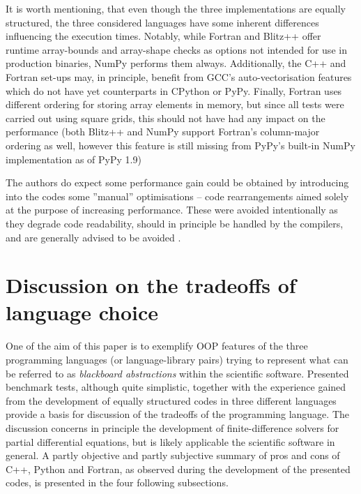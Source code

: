 \documentclass[final,5p,times,twocolumn]{elsarticle}
\begin{document}
  It is worth mentioning, that even though the three implementations are equally structured,
    the three considered languages have some inherent differences influencing the execution times.
  Notably, while Fortran and Blitz++ offer runtime array-bounds and array-shape checks as options
    not intended for use in production binaries, NumPy performs them always.
  Additionally, the C++ and Fortran set-ups may, in principle, benefit from GCC's auto-vectorisation
    features which do not have yet counterparts in CPython or PyPy.
  Finally, Fortran uses different ordering for storing array elements in memory, but since
    all tests were carried out using square grids, this should not have had any impact on the
    performance (both Blitz++ and NumPy support Fortran's column-major ordering as well, 
    however this feature is still missing from PyPy's built-in NumPy implementation as of PyPy 1.9)

  The authors do expect some performance gain could 
    be obtained by introducing into the codes some ''manual'' optimisations -- 
    code rearrangements aimed solely at the purpose of increasing performance.
  These were avoided intentionally as they degrade code readability,
    should in principle be handled by the compilers,
    and are generally advised to be avoided \citep[e.g.][section 3.12]{bib_CERNcpp}.
 
  \section{Discussion on the tradeoffs of language choice}

  One of the aim of this paper is to exemplify OOP features of the three
    programming languages (or language-library pairs)  trying to represent
    what can be referred to as {\em blackboard abstractions} \citep{Rouson_et_al_2012} within the
     scientific software.
  Presented benchmark tests, although quite simplistic, together with the experience gained 
    from the development of equally structured codes in three different
    languages provide a basis for discussion of the tradeoffs of the programming language.
  The discussion concerns in principle the development of finite-difference solvers for 
    partial differential equations, but is likely applicable the scientific software in general.
  A partly objective and partly subjective summary of pros and cons of C++, Python and Fortran,
    as observed during the development of the presented codes, is presented in the four following subsections.
\end{document}
